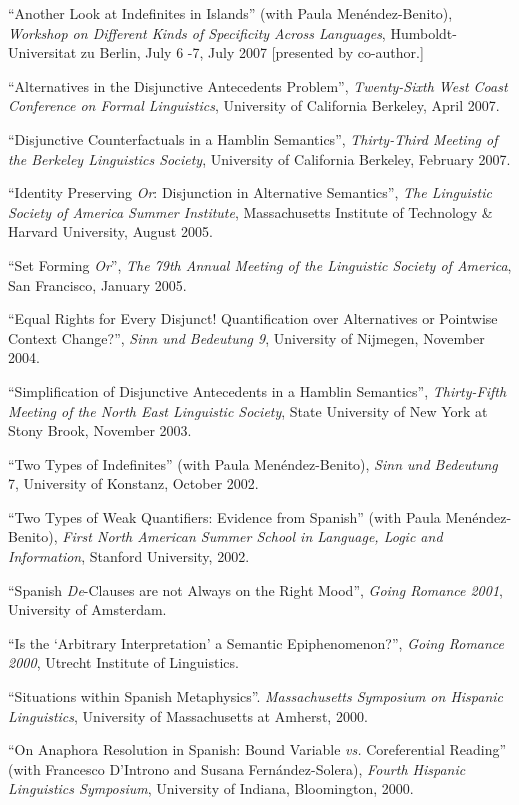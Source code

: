 \documentclass[11pt]{article}
\begin{document}
``Another Look at Indefinites in Islands'' (with Paula
  Men\'endez-Benito), \textit{Workshop on Different Kinds of Specificity
  Across Languages}, Humboldt-Universitat zu Berlin, July 6
  -7, July 2007 [presented by co-author.]

``Alternatives in the Disjunctive Antecedents Problem'', \textit{Twenty-Sixth West Coast Conference on Formal Linguistics}, University of California Berkeley, April 2007.


``Disjunctive Counterfactuals in a Hamblin Semantics'', \textit{Thirty-Third Meeting of the Berkeley Linguistics Society}, University of California Berkeley, February 2007. 

``Identity Preserving \textit{Or}: Disjunction in Alternative Semantics'', \textit{The Linguistic Society of America Summer Institute}, Massachusetts Institute of Technology \& Harvard University, August 2005. 

``Set Forming \textit{Or}'', \textit{The 79th Annual Meeting of the Linguistic Society of America}, San Francisco, January 2005. 

``Equal Rights for Every Disjunct! Quantification over Alternatives or Pointwise Context Change?'', \textit{Sinn und Bedeutung 9}, University of Nijmegen, November 2004. 

``Simplification of Disjunctive Antecedents in a Hamblin Semantics'', \textit{Thirty-Fifth
  Meeting of the North East Linguistic Society}, State University of New York at Stony Brook, November 2003. 

``Two Types of Indefinites'' (with Paula Men\'endez-Benito), \textit{Sinn und Bedeutung} 7, University of Konstanz, October 2002. 

``Two Types of Weak Quantifiers: Evidence from Spanish'' (with Paula Men\'endez-Benito), \textit{First North American Summer School in Language, Logic and Information}, Stanford University, 2002. 

``Spanish \textit{De}-Clauses are not Always on the Right Mood'', \textit{Going Romance 2001}, University of Amsterdam. 

``Is the `Arbitrary Interpretation' a Semantic Epiphenomenon?'', \textit{Going Romance 2000}, Utrecht Institute of Linguistics.

``Situations within Spanish Metaphysics''. \textit{Massachusetts Symposium on Hispanic Linguistics}, University of Massachusetts at Amherst, 2000. 

``On Anaphora Resolution in Spanish: Bound Variable \textit{vs.} Coreferential Reading'' (with Francesco D'Introno and Susana Fern\'andez-Solera), \textit{Fourth Hispanic Linguistics Symposium}, University of Indiana, Bloomington, 2000. 
\end{document}

